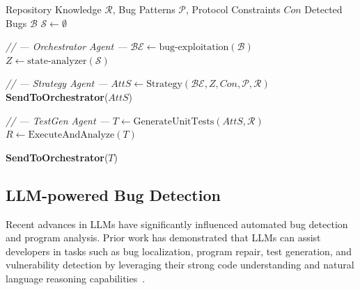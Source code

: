 \documentclass{article}
\theoremstyle{plain}
\theoremstyle{definition}
\theoremstyle{remark}
\newcommand{\consensustester}{Agora\xspace}
\begin{document}
\begin{algorithm}[!t]
\caption{\consensustester Workflow}
\label{alg:workflow}
\begin{algorithmic}[1]
     Repository Knowledge $\mathcal{R}$, Bug Patterns $\mathcal{P}$, Protocol Constraints $Con$
     Detected Bugs $\mathcal{B}$
    \STATE $\mathcal{S} \leftarrow \emptyset$ 
    
        \STATE \textit{// --- Orchestrator Agent ---}
        \STATE $\mathcal{BE} \leftarrow \text{bug-exploitation}(\mathcal{B})$ 
        \STATE $Z \leftarrow \text{state-analyzer}(\mathcal{S})$ 
        
        \STATE \textit{// --- Strategy Agent ---}
        \STATE $AttS \leftarrow \text{Strategy}(\mathcal{BE}, Z, Con, \mathcal{P}, \mathcal{R})$ 
        \STATE \textbf{SendToOrchestrator}($AttS$) 
        
        \STATE \textit{// --- TestGen Agent ---}
        \REPEAT
            \STATE $T \leftarrow \text{GenerateUnitTests}(AttS, \mathcal{R})$ 
            \STATE $R \leftarrow \text{ExecuteAndAnalyze}(T)$
        
            \STATE \textbf{SendToOrchestrator}($T$) 
        \ENDIF
    \ENDWHILE
\end{algorithmic}
\end{algorithm}




\subsection{LLM-powered Bug Detection} 
Recent advances in LLMs have significantly influenced automated bug detection and program analysis. Prior work has demonstrated that LLMs can assist developers in tasks such as bug localization, program repair, test generation, and vulnerability detection by leveraging their strong code understanding and natural language reasoning capabilities~\cite{feng2020codebert,chen2021evaluating,pearce2022asleep}. 
\end{document}
